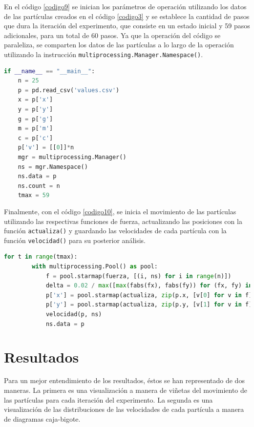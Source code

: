 \documentclass{report}
\begin{document}
En el c\'odigo \ref{codigo9} se inician los par\'ametros de operaci\'on utilizando los datos de las part\'iculas creados en el c\'odigo \ref{codigo3} y se establece la cantidad de pasos que dura la iteraci\'on del experimento, que consiste en un estado inicial y 59 pasos adicionales, para un total de 60 pasos. Ya que la operaci\'on del c\'odigo se paraleliza, se comparten los datos de las part\'iculas a lo largo de la operaci\'on utilizando la instrucci\'on \texttt{multiprocessing.Manager.Namespace()}.

\begin{lstlisting}[caption=Inicio de Par\'ametros de Operaci\'on, label=codigo9, language=Python]
if __name__ == "__main__":
    n = 25
    p = pd.read_csv('values.csv')
    x = p['x']
    y = p['y']
    g = p['g']
    m = p['m']
    c = p['c']
    p['v'] = [[0]]*n
    mgr = multiprocessing.Manager()
    ns = mgr.Namespace()
    ns.data = p
    ns.count = n 
    tmax = 59
\end{lstlisting}

Finalmente, con el c\'odigo \ref{codigo10}, se inicia el movimiento de las part\'iculas utilizando las respectivas funciones de fuerza, actualizando las posiciones con la funci\'on \texttt{actualiza()} y guardando las velocidades de cada part\'icula con la funci\'on \texttt{velocidad()} para su posterior an\'alisis.

\begin{lstlisting}[caption=Movimiento de Part\'iculas, label=codigo10, language=Python]
    for t in range(tmax):
        with multiprocessing.Pool() as pool:
            f = pool.starmap(fuerza, [(i, ns) for i in range(n)])
            delta = 0.02 / max([max(fabs(fx), fabs(fy)) for (fx, fy) in f])
            p['x'] = pool.starmap(actualiza, zip(p.x, [v[0] for v in f], repeat(delta)))
            p['y'] = pool.starmap(actualiza, zip(p.y, [v[1] for v in f], repeat(delta)))
            velocidad(p, ns)
            ns.data = p
\end{lstlisting}

\section{Resultados}
Para un mejor entendimiento de los resultados, \'estos se han representado de dos maneras. La primera es una visualizaci\'on a manera de vi\~netas del movimiento de las part\'iculas para cada iteraci\'on del experimento. La segunda es una visualizaci\'on de las distribuciones de las velocidades de cada part\'icula a manera de diagramas caja-bigote.\\
\end{document}
